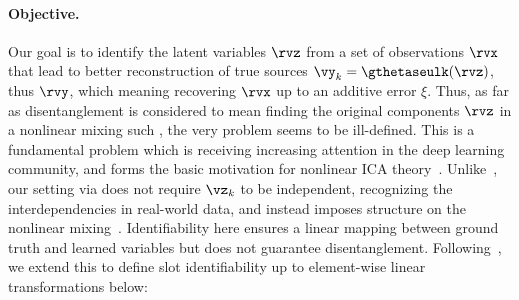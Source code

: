 \documentclass{article} %
\theoremstyle{plain}
\theoremstyle{definition}
\theoremstyle{remark}
\numberwithin{equation}{section}
\begin{document}

\paragraph{Objective.} Our goal is to identify the latent variables $\rvz$ from a set of observations $\rvx$ that lead to better reconstruction of true sources $\vy_{k} = \gthetaseulk(\rvz)$, thus $\rvy$, which meaning recovering $\rvx$ up to an additive error $\xi$. Thus, as far as disentanglement is considered to mean finding the original components $\rvz$ in a nonlinear mixing such , the very problem seems to be ill-defined. This is a fundamental problem which is receiving increasing attention in the deep learning community, and forms the basic motivation for nonlinear ICA theory~\citep{HYVARINEN1999429}.
Unlike~\citep{Hyvrinen2023NonlinearIC}, our setting via  does not require $\vz_k$ to be independent, recognizing the interdependencies in real-world data, and instead imposes structure on the nonlinear mixing~. Identifiability here ensures a linear mapping between ground truth and learned variables but does not guarantee disentanglement. Following~\citep{lachapelle2022disentanglement, locatelloObjectCentricLearningSlot2020}, we extend this to define slot identifiability up to element-wise linear transformations below: 
\end{document}

